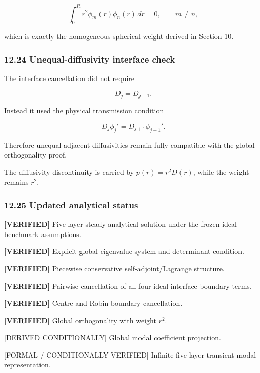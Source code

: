 \documentclass[11pt,a4paper]{article}
\begin{document}
\begin{equation}
\boxed{
\int_0^R
r^2\phi_m(r)\phi_n(r)\,dr
=
0,
\qquad
m\ne n,
}
\tag{TRISO-ML-571}
\label{eq:triso-ml-571}
\end{equation}

which is exactly the homogeneous spherical weight derived in Section 10.

\subsubsection*{12.24 Unequal-diffusivity interface check}

The interface cancellation did not require

\begin{equation}
D_j=D_{j+1}.
\tag{TRISO-ML-572}
\label{eq:triso-ml-572}
\end{equation}

Instead it used the physical transmission condition

\begin{equation}
D_j\phi_j'
=
D_{j+1}\phi_{j+1}'.
\tag{TRISO-ML-573}
\label{eq:triso-ml-573}
\end{equation}

Therefore unequal adjacent diffusivities remain fully compatible with the global orthogonality proof.

The diffusivity discontinuity is carried by $p(r)=r^2D(r)$, while the weight remains $r^2$.

\subsubsection*{12.25 Updated analytical status}

\textbf{[VERIFIED]} Five-layer steady analytical solution under the frozen ideal benchmark assumptions.

\textbf{[VERIFIED]} Explicit global eigenvalue system and determinant condition.

\textbf{[VERIFIED]} Piecewise conservative self-adjoint/Lagrange structure.

\textbf{[VERIFIED]} Pairwise cancellation of all four ideal-interface boundary terms.

\textbf{[VERIFIED]} Centre and Robin boundary cancellation.

\textbf{[VERIFIED]} Global orthogonality with weight $r^2$.

[DERIVED CONDITIONALLY] Global modal coefficient projection.

[FORMAL / CONDITIONALLY VERIFIED] Infinite five-layer transient modal representation.
\end{document}

